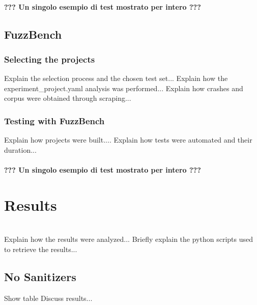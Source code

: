 \documentclass[Lau,oneside]{sapthesis}%
\begin{document}
\subsubsection{??? Un singolo esempio di test mostrato per intero ???}

\newpage
\section{FuzzBench}
\subsection{Selecting the projects}
Explain the selection process and the chosen test set...
\newline \newline
Explain how the experiment\_project.yaml analysis was performed...
\newline \newline
Explain how crashes and corpus were obtained through scraping...
\newline \newline
\subsection{Testing with FuzzBench}
Explain how projects were built....
\newline \newline
Explain how tests were automated and their duration...
\subsubsection{??? Un singolo esempio di test mostrato per intero ???}


\newpage
\chapter{Results}
\ \\
Explain how the results were analyzed...
\newline \newline
Briefly explain the python scripts used to retrieve the results...



\newpage
\section{No Sanitizers}
Show table
\newline \newline
Discuss results...
\end{document}
